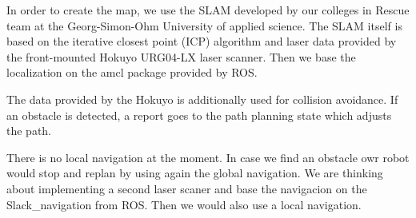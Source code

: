 In order to create the map, we use the SLAM developed by our colleges in Rescue team at the Georg-Simon-Ohm University of applied science. The SLAM itself is based on the iterative closest point (ICP) algorithm and laser data provided by the front-mounted Hokuyo URG04-LX laser scanner. Then we base the localization on the amcl package provided by ROS.

The data provided by the Hokuyo is additionally used for collision avoidance. If an obstacle is detected, a report goes to the path planning state which adjusts the path.

There is no local navigation at the moment. In case we find an obstacle owr robot would stop and replan by using again the global navigation. We are thinking about implementing a second laser scaner and base the navigacion on the Slack\_navigation from ROS. Then we would also use a local navigation.
